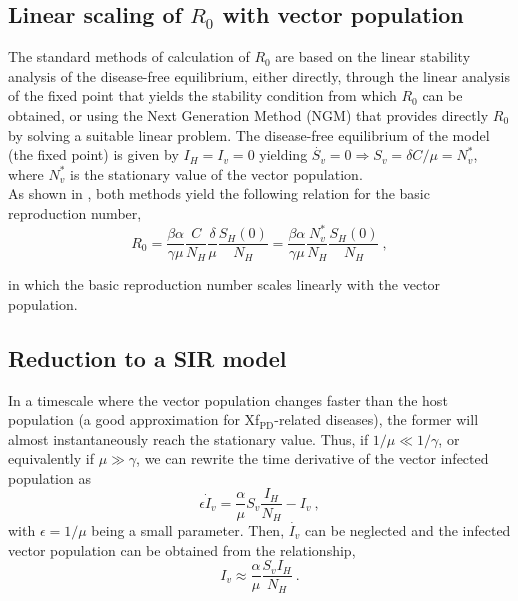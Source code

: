 \subsection{Linear scaling of $R_0$ with vector population}

The standard methods of calculation of $R_0$ are based on the linear
stability analysis of the disease-free equilibrium, either directly, through
the linear analysis of the fixed point that yields the stability condition from
which $R_0$ can be obtained, or using the Next Generation Method (NGM)
\cite{Diekmann2010} that provides directly $R_0$ by solving a suitable linear
problem. The disease-free equilibrium of the model (the fixed point) is given
by $I_H=I_v=0$ yielding $\dot{S_v}=0\Longrightarrow S_v=\delta C/\mu=N_v^*$,
where $N_v^*$ is the stationary value of the vector population.\\

As shown in \cite{GimenezRomero2022_PRE}, both methods yield the following
relation for the basic reproduction number,
\begin{equation}
    R_0 = \frac{\beta \alpha}{\gamma
        \mu}\frac{C}{N_H}\frac{\delta}{\mu}\frac{S_H(0)}{N_H}=\frac{\beta
        \alpha}{\gamma \mu}\frac{N_v^*}{N_H}\frac{S_H(0)}{N_H}\ ,
\end{equation}

in which the basic reproduction number scales linearly with the vector
population.

\subsection{Reduction to a SIR model}

In a timescale where the vector population changes faster than the host
population (a good approximation for Xf$_{\textrm{PD}}$-related diseases), the
former will almost instantaneously reach the stationary value. Thus, if
$1/\mu\ll1/\gamma$, or equivalently if $\mu\gg\gamma$, we can rewrite the time
derivative of the vector infected population as
\begin{equation}
    \epsilon\dot{I}_v=\frac{\alpha}{\mu}S_v\frac{I_H}{N_H} - I_v \ ,
\end{equation}
with $\epsilon=1/\mu$ being a small parameter. Then, $\dot{I_v}$ can be
neglected and the infected vector population can be obtained from the
relationship,
\begin{equation}\label{eq:Iv_timescale_approx}
    I_v\approx\frac{\alpha}{\mu}\frac{S_v I_H}{N_H} \ .
\end{equation}

